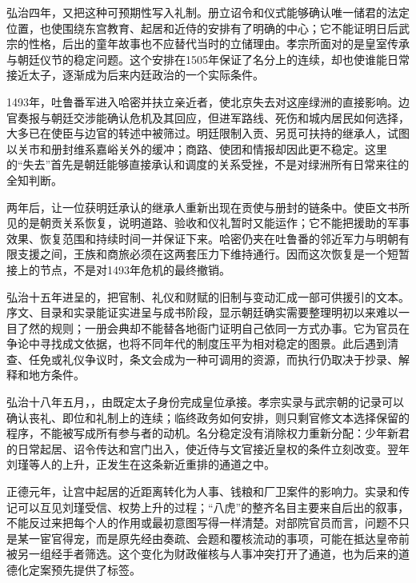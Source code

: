 弘治四年，又把这种可预期性写入礼制。册立诏令和仪式能够确认唯一储君的法定位置，也使围绕东宫教育、起居和近侍的安排有了明确的中心；它不能证明日后武宗的性格，后出的童年故事也不应替代当时的立储理由。孝宗所面对的是皇室传承与朝廷仪节的稳定问题。这个安排在1505年保证了名分上的连续，却也使谁能日常接近太子，逐渐成为后来内廷政治的一个实际条件。

1493年，吐鲁番军进入哈密并扶立亲近者，使北京失去对这座绿洲的直接影响。边官奏报与朝廷交涉能确认危机及其回应，但进军路线、死伤和城内居民如何选择，大多已在使臣与边官的转述中被筛过。明廷限制入贡、另觅可扶持的继承人，试图以关市和册封维系嘉峪关外的缓冲；商路、使团和情报却因此更不稳定。这里的“失去”首先是朝廷能够直接承认和调度的关系受挫，不是对绿洲所有日常来往的全知判断。

两年后，让一位获明廷承认的继承人重新出现在贡使与册封的链条中。使臣文书所见的是朝贡关系恢复，说明道路、验收和仪礼暂时又能运作；它不能把援助的军事效果、恢复范围和持续时间一并保证下来。哈密仍夹在吐鲁番的邻近军力与明朝有限支援之间，王族和商旅必须在这两套压力下维持通行。因而这次恢复是一个短暂接上的节点，不是对1493年危机的最终撤销。

弘治十五年进呈的，把官制、礼仪和财赋的旧制与变动汇成一部可供援引的文本。序文、目录和实录能证实进呈与成书阶段，显示朝廷确实需要整理明初以来难以一目了然的规则；一册会典却不能替各地衙门证明自己依同一方式办事。它为官员在争论中寻找成文依据，也将不同年代的制度压平为相对稳定的图景。此后遇到清查、任免或礼仪争议时，条文会成为一种可调用的资源，而执行仍取决于抄录、解释和地方条件。

弘治十八年五月，，由既定太子身份完成皇位承接。孝宗实录与武宗朝的记录可以确认丧礼、即位和礼制上的连续；临终政务如何安排，则只剩官修文本选择保留的程序，不能被写成所有参与者的动机。名分稳定没有消除权力重新分配：少年新君的日常起居、诏令传达和宫门出入，使近侍与文官接近皇权的条件立刻改变。翌年刘瑾等人的上升，正发生在这条新近重排的通道之中。

正德元年，让宫中起居的近距离转化为人事、钱粮和厂卫案件的影响力。实录和传记可以互见刘瑾受信、权势上升的过程；“八虎”的整齐名目主要来自后出的叙事，不能反过来把每个人的作用或最初意图写得一样清楚。对部院官员而言，问题不只是某一宦官得宠，而是原先经由奏疏、会题和覆核流动的事项，可能在抵达皇帝前被另一组经手者筛选。这个变化为财政催核与人事冲突打开了通道，也为后来的道德化定案预先提供了标签。

